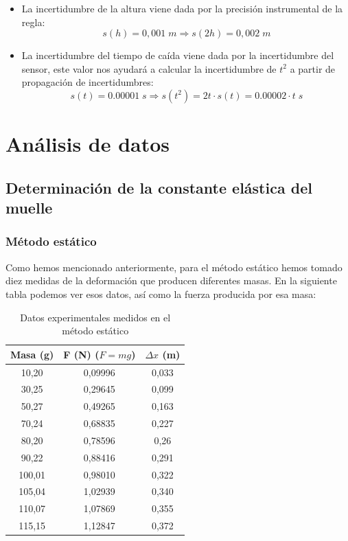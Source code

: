 \documentclass[a4paper,12pt,titlepage]{report}
\begin{document}
\begin{itemize}
    \item La incertidumbre de la altura viene dada por la precisión instrumental de la regla:
    \begin{equation}
        s(h) = 0,001\; m \Rightarrow s(2h) = 0,002 \; m
    \end{equation}
    \item La incertidumbre del tiempo de caída viene dada por la incertidumbre del sensor, este valor nos ayudará a calcular la incertidumbre de $t^2$ a partir de propagación de incertidumbres:
    \begin{equation}
        s(t) = 0.00001 \; s \Rightarrow s(t^2)= 2t \cdot s(t) = 0.00002 \cdot t \; s
        \label{Inc Tcuadrado}
    \end{equation}
\end{itemize}

\newpage

\section{Análisis de datos}

\subsection{Determinación de la constante elástica del muelle}

\subsubsection{Método estático}

Como hemos mencionado anteriormente, para el método estático hemos tomado diez medidas de la deformación que producen diferentes masas. En la siguiente tabla podemos ver esos datos, así como la fuerza producida por esa masa:

\begin{table}[h!]
    \centering
    \begin{tabular}{|c|c|c|}
    \hline
    Masa (g) & F (N) ($F=mg$) & $\Delta x$ (m) \\ \hline
    10,20   & 0,09996 & 0,033 \\ \hline
    30,25  & 0,29645 & 0,099 \\ \hline
    50,27  & 0,49265 & 0,163 \\ \hline
    70,24  & 0,68835 & 0,227 \\ \hline
    80,20   & 0,78596 & 0,26  \\ \hline
    90,22  & 0,88416 & 0,291 \\ \hline
    100,01 & 0,98010 & 0,322 \\ \hline
    105,04 & 1,02939 & 0,340  \\ \hline
    110,07 & 1,07869 & 0,355 \\ \hline
    115,15 & 1,12847 & 0,372 \\ \hline
    \end{tabular}
    \caption{Datos experimentales medidos en el método estático}
    \label{Datos estatico}
\end{table}
\end{document}
